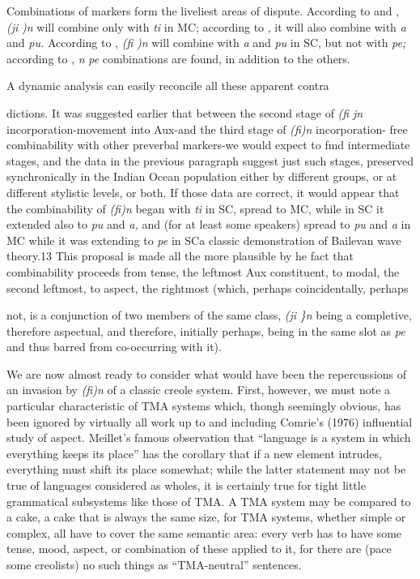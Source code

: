 Combinations of markers form the liveliest areas of dispute. According to \citet{Baker1972} and \citet{Valdman1980}, \textit{(ji} \textit{)n} will combine only with \textit{ti} in MC; according to \citet{Moorghen1975}, it will also combine with \textit{a} and \textit{pu.} According to \citet{Bailee1977}, \textit{(fi} \textit{)n} will combine with \textit{a} and \textit{pu} in SC, but not with \textit{pe;} according to \citet{Corne1977}, \textit{n} \textit{pe} com\-binations are found, in addition to the others.

A dynamic analysis can easily reconcile all these apparent contra\-

dictions. It was suggested earlier that between the second stage of \textit{(fi} \textit{jn} incorporation-movement into Aux-and the third stage of \textit{(fi)n} incorporation- free combinability with other preverbal markers-we would expect to fmd intermediate stages, and the data in the previous paragraph suggest just such stages, preserved synchronically in the Indian Ocean population either by different groups, or at different stylistic levels, or both. If those data are correct, it would appear that the combinability of \textit{(fi)n} began with \textit{ti} in SC, spread to MC, while in SC it extended also to \textit{pu} and \textit{a,} and (for at least some speak\-ers) spread to \textit{pu }and \textit{a} in MC while it was extending to \textit{pe }in SC\-a classic demonstration of Bailevan wave theory.13 This proposal is made all the more plausible by he fact that combinability proceeds from tense, the leftmost Aux constituent, to modal, the second left\-most, to aspect, the rightmost (which, perhaps coincidentally, perhaps

  


 


not, is a conjunction of two members of the same class, \textit{(}\textit{ji} \textit{\}n }being a completive, therefore aspectual, and therefore, initially perhaps, being in the same slot as \textit{pe }and thus barred from co-occurring with it).

We are now almost ready to consider what would have been the repercussions of an invasion by \textit{(fi)n} of a classic creole system. First, however, we must note a particular characteristic of TMA systems which, thongh seemingly obvious, has been ignored by virtually all work up to and including Comrie's (1976) influential study of aspect. Meillet's famous observation that ``language is a system in which every\-thing keeps its place'' has the corollary that if a new element intrudes, everything must shift its place somewhat; while the latter statement may not be true of languages considered as wholes, it is certainly true for tight little grammatical subsystems like those of TMA. A TMA system may be compared to a cake, a cake that is always the same size, for TMA systems, whether simple or complex, all have to cover the same semantic area: every verb has to have some tense, mood, aspect, or combination of these applied to it, for there are (pace some creolists) no such things as ``TMA-neutral'' sentences.

